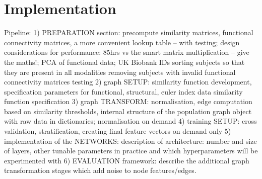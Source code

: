 \chapter{Implementation}


Pipeline:
1) PREPARATION section:
precompute similarity matrices, functional connectivity matrices, a more convenient lookup table – with testing; design considerations for performance: 85hrs vs the smart matrix multiplication – give the maths!;
PCA of functional data;
UK Biobank IDs 
sorting subjects so that they are present in all modalities
removing subjects with invalid functional connectivity matrices
testing
2) graph SETUP:
similarity function development, 
specification parameters for functional, structural, euler index data
similarity function specification
3) graph TRANSFORM:
normalisation, edge computation based on similarity thresholds, internal structure of the population graph object with raw data in dictionaries; normalisation on demand
4) training SETUP: cross validation, stratification, creating final feature vectors on demand only
5) implementation of the NETWORKS: description of architecture: number and size of layers, other tunable parameters in practice and which hyperparameters will be experimented with
6) EVALUATION framework: describe the additional graph transformation stages which add noise to node features/edges.

